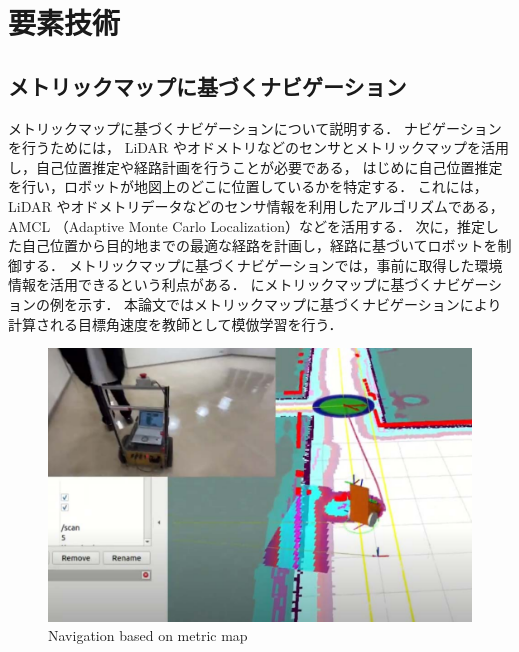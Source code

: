 \chapter{要素技術}
\section{メトリックマップに基づくナビゲーション}
メトリックマップに基づくナビゲーションについて説明する．
ナビゲーションを行うためには， LiDAR やオドメトリなどのセンサとメトリックマップを活用し，自己位置推定や経路計画を行うことが必要である，
はじめに自己位置推定を行い，ロボットが地図上のどこに位置しているかを特定する．
これには， LiDAR やオドメトリデータなどのセンサ情報を利用したアルゴリズムである， AMCL （Adaptive Monte Carlo Localization）などを活用する．
次に，推定した自己位置から目的地までの最適な経路を計画し，経路に基づいてロボットを制御する．
メトリックマップに基づくナビゲーションでは，事前に取得した環境情報を活用できるという利点がある．
にメトリックマップに基づくナビゲーションの例を示す．
本論文ではメトリックマップに基づくナビゲーションにより計算される目標角速度を教師として模倣学習を行う．

\begin{figure}[htbp]
  \centering
  \includegraphics[width=130mm]{images/pdf/other/nav.pdf}
  \caption{Navigation based on metric map}
  \label{fig:nav}
\end{figure}